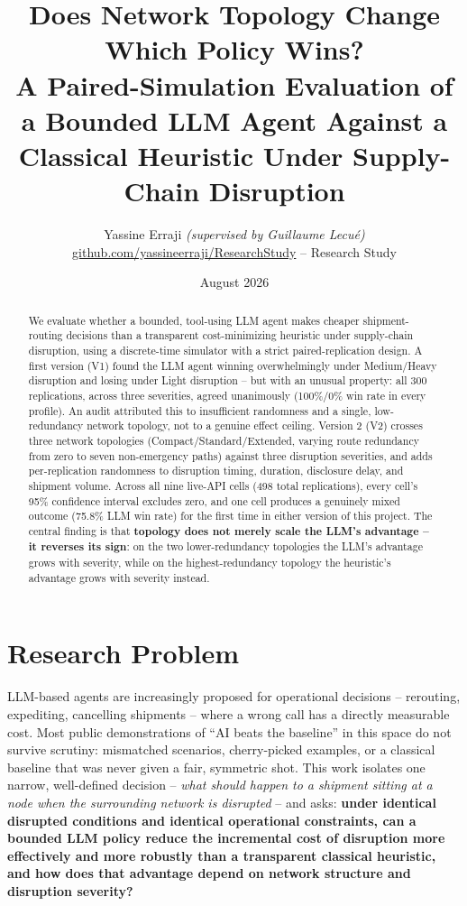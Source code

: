 \documentclass[10pt,twocolumn]{article}
\title{\vspace{-1.2em}\textbf{Does Network Topology Change Which Policy Wins?\\
\large A Paired-Simulation Evaluation of a Bounded LLM Agent Against a Classical Heuristic Under Supply-Chain Disruption}}
\author{\small Yassine Erraji \textit{(supervised by Guillaume Lecu\'e)} \\[-2pt] \small \href{https://github.com/yassineerraji/ResearchStudy}{github.com/yassineerraji/ResearchStudy} -- Research Study}
\date{\small August 2026}
\begin{document}
\maketitle
\vspace{-1.8em}

\begin{abstract}
\noindent We evaluate whether a bounded, tool-using LLM agent makes cheaper shipment-routing decisions than a transparent cost-minimizing heuristic under supply-chain disruption, using a discrete-time simulator with a strict paired-replication design. A first version (V1) found the LLM agent winning overwhelmingly under Medium/Heavy disruption and losing under Light disruption -- but with an unusual property: all 300 replications, across three severities, agreed unanimously (100\%/0\% win rate in every profile). An audit attributed this to insufficient randomness and a single, low-redundancy network topology, not to a genuine effect ceiling. Version 2 (V2) crosses three network topologies (Compact/Standard/Extended, varying route redundancy from zero to seven non-emergency paths) against three disruption severities, and adds per-replication randomness to disruption timing, duration, disclosure delay, and shipment volume. Across all nine live-API cells (498 total replications), every cell's 95\% confidence interval excludes zero, and one cell produces a genuinely mixed outcome (75.8\% LLM win rate) for the first time in either version of this project. The central finding is that \textbf{topology does not merely scale the LLM's advantage -- it reverses its sign}: on the two lower-redundancy topologies the LLM's advantage grows with severity, while on the highest-redundancy topology the heuristic's advantage grows with severity instead.
\end{abstract}

\section{Research Problem}
\label{sec:intro}
LLM-based agents are increasingly proposed for operational decisions -- rerouting, expediting, cancelling shipments -- where a wrong call has a directly measurable cost. Most public demonstrations of ``AI beats the baseline'' in this space do not survive scrutiny: mismatched scenarios, cherry-picked examples, or a classical baseline that was never given a fair, symmetric shot. This work isolates one narrow, well-defined decision -- \emph{what should happen to a shipment sitting at a node when the surrounding network is disrupted} -- and asks: \textbf{under identical disrupted conditions and identical operational constraints, can a bounded LLM policy reduce the incremental cost of disruption more effectively and more robustly than a transparent classical heuristic, and how does that advantage depend on network structure and disruption severity?}
\end{document}
